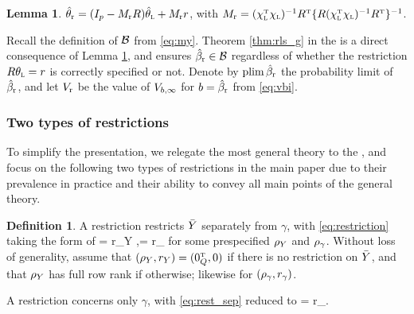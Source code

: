 \documentclass[11pt]{article}
\theoremstyle{definition}
\newtheorem{lemma}{Lemma}
\newtheorem{definition}{Definition}
\begin{document}
\begin{lemma}
\label{lem:hthr}
$\hthlr %
= (I_p-\mr R) \hthl + \mr r$, 
with $M_{\textup{r}}=  (\chi_{\textsc{l}}^{ \mathrm{\scriptscriptstyle T} }\chi_{\textsc{l}})^{-1} R^{ \mathrm{\scriptscriptstyle T} }\{R (\chi_{\textsc{l}}^{ \mathrm{\scriptscriptstyle T} }\chi_{\textsc{l}})^{-1} R^{ \mathrm{\scriptscriptstyle T} }\}^{-1}$.
\end{lemma}

Recall the definition of $\mathcal{B}$ from \eqref{eq:my}.
Theorem \ref{thm:rls_g} in the {\sm} is a direct consequence of Lemma \ref{lem:hthr}, 
and ensures $\hat\beta_{\textup{r}} \in \mathcal{B}$  regardless of whether the restriction  $R\theta_{\textsc{l}} = r$  is correctly specified or not.
%
Denote by $\textup{plim\,} \hat\beta_{\textup{r}}$ the probability limit of $\hat\beta_{\textup{r}}$, %
and 
let $V_{\textup{r}}$ be the value of $V_{b,\infty}$ for $b =\hat\beta_{\textup{r}}$ from \eqref{eq:vbi}.
 

\subsubsection{Two types of restrictions}


To simplify the presentation, we relegate the most general theory to the {\sm}, and focus on the following two types of restrictions in the main paper due to their prevalence in practice and their ability to convey all main points of the general theory.


\begin{definition}\label{def::restrictions} 
A {\it \so} restriction restricts $\bar Y$ separately from $\gamma$, with \eqref{eq:restriction} taking the form of  
\beginy\label{eq:rest_sep}
\rhy\by = r_Y ,\qquad  \rhg \gamma  = r_\gamma
\endy  
for some prespecified $\rho_Y$ and $\rho_\gamma$.
Without loss of generality, assume that $(\rho_Y, r_Y) = ( 0_Q^{ \mathrm{\scriptscriptstyle T} }, 0)$ if there is no restriction on $\bar Y$, and that $\rho_Y$ has full row rank if otherwise; likewise for $(\rho_\gamma, r_\gamma)$.  

A {\it \go} restriction concerns only $\gamma$, with  \eqref{eq:rest_sep}  reduced to 
\beginy\label{eq:rest_noy}
 \rhg \gamma = r_\gamma.
\endy
\end{definition}
\end{document}
